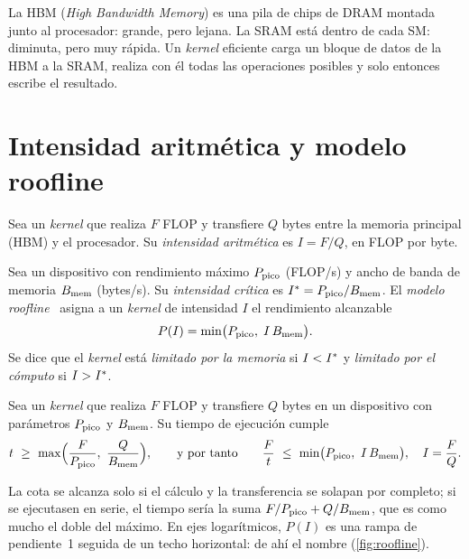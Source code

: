 La HBM (\emph{High Bandwidth Memory}) es una pila de chips de DRAM montada junto al procesador: grande, pero lejana. La SRAM está dentro de cada SM: diminuta, pero muy rápida. Un \emph{kernel} eficiente carga un bloque de datos de la HBM a la SRAM, realiza con él todas las operaciones posibles y solo entonces escribe el resultado.

\section{Intensidad aritmética y modelo roofline}

\begin{definicion}
Sea un \emph{kernel} que realiza $F$ FLOP y transfiere $Q$ bytes entre la memoria principal (HBM) y el procesador. Su \emph{intensidad aritmética} es $I=F/Q$, en FLOP por byte.
\end{definicion}

\begin{definicion}
Sea un dispositivo con rendimiento máximo $P_{\mathrm{pico}}$ (FLOP/s) y ancho de banda de memoria $B_{\mathrm{mem}}$ (bytes/s). Su \emph{intensidad crítica} es $I^{\ast}=P_{\mathrm{pico}}/B_{\mathrm{mem}}$. El \emph{modelo roofline}~\cite{roofline} asigna a un \emph{kernel} de intensidad $I$ el rendimiento alcanzable
\[
P(I)=\min\bigl(P_{\mathrm{pico}},\;I\,B_{\mathrm{mem}}\bigr).
\]
Se dice que el \emph{kernel} está \emph{limitado por la memoria} si $I<I^{\ast}$ y \emph{limitado por el cómputo} si $I>I^{\ast}$.
\end{definicion}

\begin{teorema}\label{teo:roofline}
Sea un \emph{kernel} que realiza $F$ FLOP y transfiere $Q$ bytes en un dispositivo con parámetros $P_{\mathrm{pico}}$ y $B_{\mathrm{mem}}$. Su tiempo de ejecución cumple
\[
t\ \ge\ \max\Bigl(\frac{F}{\Ppico},\ \frac{Q}{\Bmem}\Bigr),
\qquad\text{y por tanto}\qquad
\frac{F}{t}\ \le\ \min\bigl(\Ppico,\ I\,\Bmem\bigr),\quad I=\frac{F}{Q}.
\]
\end{teorema}

La cota se alcanza solo si el cálculo y la transferencia se solapan por completo; si se ejecutasen en serie, el tiempo sería la suma $F/P_{\mathrm{pico}}+Q/B_{\mathrm{mem}}$, que es como mucho el doble del máximo. En ejes logarítmicos, $P(I)$ es una rampa de pendiente~1 seguida de un techo horizontal: de ahí el nombre (\cref{fig:roofline}).

\addtocounter{figure}{1}%

\addtocounter{definicion}{1}%

